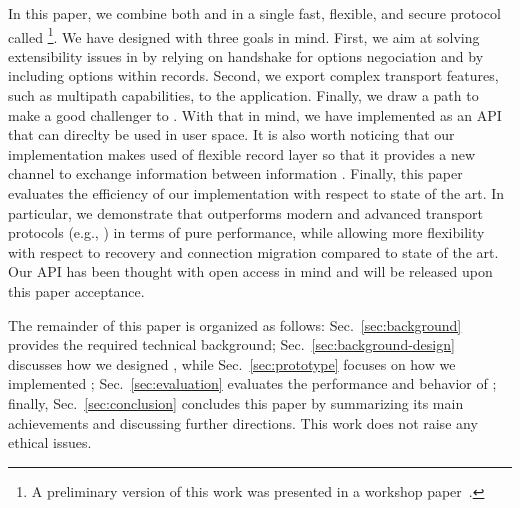 In this paper, we combine both \tcp and \tls in a single fast, flexible, and secure protocol called \textbf{\tcpls}\footnote{A preliminary version of this work was presented in a workshop paper~\cite{rochet2020tcpls}.}.  We have designed \tcpls with three goals in mind.  First, we aim at solving extensibility issues in \tcp by relying on \tls handshake for \tcp options negociation and by including \tcp options within \tls records. Second, we export complex transport features, such as multipath capabilities, to the application.  Finally, we draw a path to make \tcpls a good challenger to \quic. With that in mind, we have implemented \tcpls as an API that can direclty be used in user space.  It is also worth noticing that our implementation makes used of \tls flexible record layer so that it provides a new channel to exchange information between \tcpls information .  Finally, this paper evaluates the efficiency of our \tcpls implementation with respect to state of the art.  In particular, we demonstrate that \tcpls outperforms modern and advanced transport protocols (e.g., \quic) in terms of pure performance, while allowing more flexibility with respect to recovery and connection migration compared to state of the art.  Our \tcpls API has been thought with open access in mind and will be released upon this paper acceptance.

The remainder of this paper is organized as follows: Sec.~\ref{sec:background} provides the required technical background; Sec.~\ref{sec:background-design} discusses how we designed \tcpls, while Sec.~\ref{sec:prototype} focuses on how we implemented \tcpls; Sec.~\ref{sec:evaluation} evaluates the performance and behavior of \tcpls;  finally, Sec.~\ref{sec:conclusion} concludes this paper by summarizing its main achievements and discussing further directions.
This work does not raise any ethical issues.





